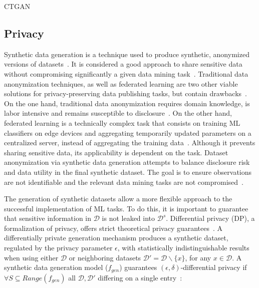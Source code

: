 \documentclass[parskip=full]{scrartcl}
\begin{document}
CTGAN~\cite{xu2019modeling}

\subsection{Privacy}\label{sec:data-privacy}

Synthetic data generation is a technique used to produce synthetic, anonymized
versions of datasets~\cite{dankar2021fake}. It is considered a good approach
to share sensitive data without compromising significantly a given data mining
task~\cite{taub2018differential, park2018data}. Traditional data anonymization
techniques, as well as federated learning are two other viable solutions for
privacy-preserving data publishing tasks, but contain
drawbacks~\cite{hernandez2022synthetic}. On the one hand, traditional data
anonymization requires domain knowledge, is labor intensive and remains
susceptible to disclosure~\cite{reiter2004new}. On the other hand, federated
learning is a technically complex task that consists on training ML
classifiers on edge devices and aggregating temporarily updated parameters on
a centralized server, instead of aggregating the training
data~\cite{yu2022survey}. Although it prevents sharing sensitive data, its
applicability is dependent on the task. Dataset anonymization via synthetic
data generation attempts to balance disclosure risk and data utility in the
final synthetic dataset. The goal is to ensure observations are not
identifiable and the relevant data mining tasks are not
compromised~\cite{singh2017aggregating, li2018privacy}.

The generation of synthetic datasets allow a more flexible approach to the
successful implementation of ML tasks. To do this, it is important to
guarantee that sensitive information in $\mathcal{D}$ is not leaked into
$\mathcal{D}^s$. Differential privacy (DP), a formalization of privacy, offers
strict theoretical privacy guarantees~\cite{rosenblatt2020differentially}. A
differentially private generation mechanism produces a synthetic dataset,
regulated by the privacy parameter $\epsilon$, with statistically
indistinguishable results when using either $\mathcal{D}$ or neighboring
datasets $\mathcal{D}' = \mathcal{D} \backslash \{x\}$, for any $x \in
\mathcal{D}$. A synthetic data generation model ($f_{gen}$) guarantees
$(\epsilon, \delta)$-differential privacy if $\forall S \subseteq
Range(f_{gen})$ all $\mathcal{D}, \mathcal{D}'$ differing on a single
entry~\cite{hardt2012simple}:
\end{document}
